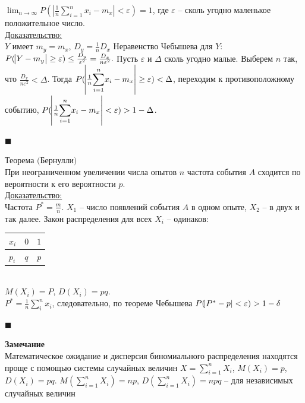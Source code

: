 \documentclass[russian, 12pt, fleqn]{article}
\begin{document}
$\displaystyle{  \lim_{n\to{\infty}}  }  \displaystyle{ P(\left |\frac{1}{n} \sum\limits_{i = 1}^{n} x_i - m_x \right | < \varepsilon) = 1}$, где $ \varepsilon$ --  сколь угодно маленькое положительное число.\\
\underline{Доказательство:}\\
$Y$ имеет $m_y=m_x$, $D_y = \frac{1}{n}D_x$ Неравенство Чебышева для $Y$:\\ $P(\abs{Y-m_y} \geq \varepsilon) \leq \frac{D_y}{\varepsilon^2} = \frac{D_x}{n\varepsilon^2}.$
Пусть $\varepsilon$ и $\Delta$ сколь угодно малые. Выберем $n$ так, что $\frac{D_x}{n\varepsilon^2} < \Delta$. Тогда $P(\abs{\frac{1}{n}  \displaystyle{\sum\limits_{i = 1}^{n}} x_i - m_x} \geq \varepsilon) < \Delta$, переходим к противоположному событию,  $P(\abs{\frac{1}{n}  \displaystyle{\sum\limits_{i = 1}^{n}} x_i - m_x} < \varepsilon) > 1 - \Delta$.\\
\begin{flushright}\(\blacksquare\)\end{flushright}
$\textbf{Теорема (Бернулли)}$\\
При неограниченном увеличении числа опытов $n$ частота события $A$ сходится по вероятности к его вероятности $p$.\\
\underline{Доказательство:}\\
Частота $P^* = \frac{m}{n}$. $X_1$ -- число появлений события $A$ в одном опыте, $X_2$ --  в двух и так далее. Закон распределения для всех $X_i$ -- одинаков:\\
\begin{tabular}[b]{ | l | l |  l |  }
\hline
$ x_i$ & $0$ & $1$   \\
\hline
  $p_i$   & $q$  & $p$   \\
\hline
\end{tabular}\\
$M(X_i) = P$, $D(X_i) = pq$.\\
$P^* = \frac{1}{n} \displaystyle{\sum_{i}^{n}} x_i$,  следовательно, по теореме Чебышева $P(\abs{P^* - p} < \varepsilon) > 1 - \delta$\\
\begin{flushright}\(\blacksquare\)\end{flushright}
\textbf{Замечание\ } \\
Математическое ожидание и дисперсия биномиального распределения находятся проще с помощью системы случайных величин $X = \displaystyle{\sum\limits_{i = 1}^{n}} X_i$, 
$M(X_i) = p$, $D(X_i) = pq$.
$M(\displaystyle{\sum\limits_{i = 1}^{n}} X_i) = np$, $D(\displaystyle{\sum\limits_{i = 1}^{n}} X_i) = npq$ -- для независимых случайных величин\\
\end{document}
